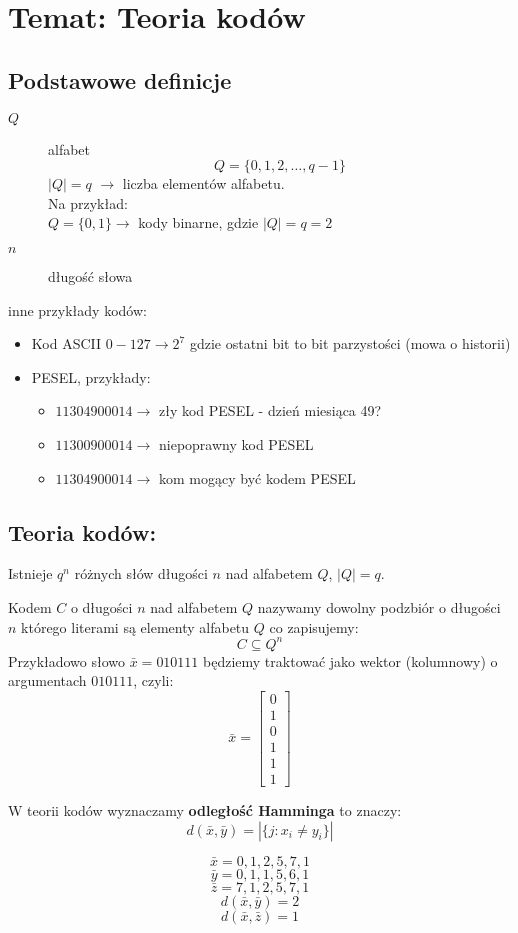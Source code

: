 \section[Wykład 10: 18-V-2017 - Temat: Teoria kodów]{Temat: Teoria kodów}
\subsection{Podstawowe definicje}
\begin{description}
\item[$Q$] alfabet $$Q=\{0,1,2,\dots ,q-1\}$$
$|Q|=q$ $\rightarrow$ liczba elementów alfabetu.\\
Na przykład:\\
$Q=\{0,1\}\rightarrow$ kody binarne, gdzie $|Q|=q=2$
\item[$n$] długość słowa
\end{description}
inne przykłady kodów:
\begin{itemize}
\item Kod ASCII $0-127\rightarrow 2^7$ gdzie ostatni bit to bit parzystości (mowa o historii)
\item PESEL, przykłady:
\begin{itemize}
\item[] $11304900014\rightarrow$ zły kod PESEL - dzień miesiąca 49? 
\item[] $11300900014\rightarrow$ niepoprawny kod PESEL
\item[] $11304900014\rightarrow$ kom mogący być kodem PESEL
\end{itemize}
\end{itemize}

\subsection{Teoria kodów:}
\begin{observation*}
Istnieje $q^n$ różnych słów długości $n$ nad alfabetem $Q$, $|Q|=q$.
\end{observation*}
\begin{definition}[Kod]
Kodem $C$ o długości $n$ nad alfabetem $Q$ nazywamy dowolny podzbiór o długości $n$ którego literami są elementy alfabetu $Q$ co zapisujemy: $$C\subseteq Q^n$$
Przykładowo słowo $\bar{x}=010111$ będziemy traktować jako wektor (kolumnowy) o argumentach $010111$, czyli: $$\bar{x}=\begin{bmatrix}
0\\1\\0\\1\\1\\1
\end{bmatrix}$$
\end{definition}
\begin{definition}
W teorii kodów wyznaczamy \textbf{odległość Hamminga} to znaczy: $$d(\bar{x},\bar{y})=|\{j:x_i\neq y_i\}|$$
\begin{multicols}{2}
$$\bar{x}=0,1,2,5,7,1$$
$$\bar{y}=0,1,1,5,6,1$$
$$\bar{z}=7,1,2,5,7,1$$
\vfill\null
\columnbreak
$$d(\bar{x},\bar{y})=2$$
$$d(\bar{x},\bar{z})=1$$
\end{multicols}
\end{definition}

